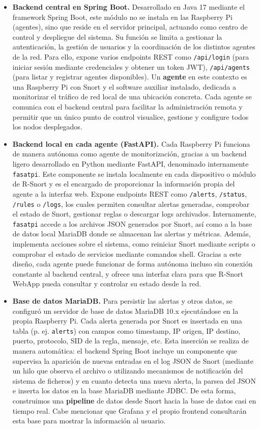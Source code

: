 \documentclass[11pt,a4paper,twoside]{report}
\begin{document}
\begin{itemize}
	\item \textbf{Backend central en Spring Boot.} Desarrollado en Java 17 mediante el framework Spring Boot, este módulo no se instala en las Raspberry Pi (agentes), sino que reside en el servidor principal, actuando como centro de control y despliegue del sistema. Su función se limita a gestionar la autenticación, la gestión de usuarios y la coordinación de los distintos agentes de la red. Para ello, expone varios endpoints REST como \texttt{/api/login} (para iniciar sesión mediante credenciales y obtener un token JWT), \texttt{/api/agents} (para listar y registrar agentes disponibles). Un \textbf{agente} en este contexto es una Raspberry Pi con Snort y el software auxiliar instalado, dedicada a monitorizar el tráfico de red local de una ubicación concreta. Cada agente se comunica con el backend central para facilitar la administración remota y permitir que un único punto de control visualice, gestione y configure todos los nodos desplegados.
	
	\item \textbf{Backend local en cada agente (FastAPI).} Cada Raspberry Pi funciona de manera autónoma como agente de monitorización, gracias a un backend ligero desarrollado en Python mediante FastAPI, denominado internamente \texttt{fasatpi}. Este componente se instala localmente en cada dispositivo o módulo de R-Snort y es el encargado de proporcionar la información propia del agente a la interfaz web. Expone endpoints REST como \texttt{/alerts}, \texttt{/status}, \texttt{/rules} o \texttt{/logs}, los cuales permiten consultar alertas generadas, comprobar el estado de Snort, gestionar reglas o descargar logs archivados. Internamente, \texttt{fasatpi} accede a los archivos JSON generados por Snort, así como a la base de datos local MariaDB donde se almacenan las alertas y métricas. Además, implementa acciones sobre el sistema, como reiniciar Snort mediante scripts o comprobar el estado de servicios mediante comandos shell. Gracias a este diseño, cada agente puede funcionar de forma autónoma incluso sin conexión constante al backend central, y ofrece una interfaz clara para que R-Snort WebApp pueda consultar y controlar su estado desde la red.
	
	\item \textbf{Base de datos MariaDB.} Para persistir las alertas y otros datos, se configuró un servidor de base de datos MariaDB 10.x ejecutándose en la propia Raspberry Pi. Cada alerta generada por Snort es insertada en una tabla (p. ej. \texttt{alerts}) con campos como timestamp, IP origen, IP destino, puerto, protocolo, SID de la regla, mensaje, etc. Esta inserción se realiza de manera automática: el backend Spring Boot incluye un componente que supervisa la aparición de nuevas entradas en el log JSON de Snort (mediante un hilo que observa el archivo o utilizando mecanismos de notificación del sistema de ficheros) y en cuanto detecta una nueva alerta, la parsea del JSON e inserta los datos en la base MariaDB mediante JDBC. De esta forma, construimos una \textbf{pipeline} de datos desde Snort hacia la base de datos casi en tiempo real. Cabe mencionar que Grafana y el propio frontend consultarán esta base para mostrar la información al usuario.
	

\end{itemize}
\end{document}
